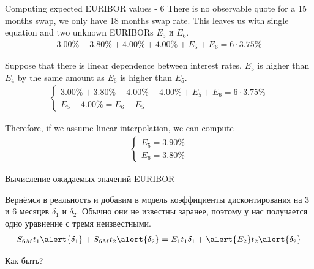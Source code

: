 \documentclass{beamer}
\begin{document}
\begin{frame}{Computing expected EURIBOR values - 6}
\justify
There is no observable quote for a 15 months swap, we only have 18 months swap rate. This leaves us with single equation and two unknown EURIBORs $E_5$ и $E_6$.
\begin{align*}
3.00\%+3.80\%+4.00\%+4.00\%+E_5+E_6 = 6\cdot3.75\%
\end{align*}

\justify
Suppose that there is linear dependence between interest rates. $E_5$ is higher than $E_4$ by the same amount as $E_6$ is higher than $E_5$.
\begin{align*}
\begin{cases}
3.00\%+3.80\%+4.00\%+4.00\%+E_5+E_6 = 6\cdot3.75\% \\
E_5 - 4.00\% = E_6 - E_5
\end{cases}
\end{align*}

Therefore, if we assume linear interpolation, we can compute
\begin{align*}
\begin{cases}
E_5 = 3.90\% \\
E_6 = 3.80\%
\end{cases}
\end{align*}
\end{frame}



\begin{frame}{Вычисление ожидаемых значений EURIBOR}
\centering
{}

\justify
Вернёмся в реальность и добавим в модель коэффициенты дисконтирования на 3 и 6 месяцев $\delta_1$ и $\delta_2$. Обычно они не известны заранее, поэтому у нас получается одно уравнение с тремя неизвестными.
\begin{align*}
S_{6M}t_1\alert{\delta_1} + S_{6M}t_2\alert{\delta_2} = E_1t_1\delta_1 + \alert{E_2}t_2\alert{\delta_2}
\end{align*}

\justify
Как быть?
\end{frame}
\end{document}

